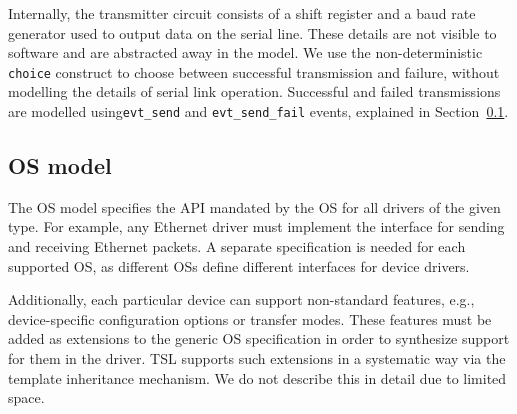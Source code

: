 \documentclass[a4paper,twoside,openright,11pt]{book}
\newcommand{\tsl}{TSL\xspace}
\theoremstyle{definition}
\newcommand{\src}[1]{\texttt{\small #1}}
\begin{document}
Internally, the transmitter circuit consists of a shift register and a baud rate generator used to output data on the serial line.  These details are not visible to software and are abstracted away in the model.  We use the non-deterministic \src{choice} construct to choose between successful transmission and failure, without modelling the details of serial link operation.  Successful and failed transmissions are modelled using\src{evt\_send} and \src{evt\_send\_fail} events, explained in Section~\ref{s:os}.

%

\subsection{OS model}\label{s:os}

The OS model specifies the API mandated by the OS for all drivers of the given type.  For example, any Ethernet driver must implement the interface for sending and receiving Ethernet packets.  A separate specification is needed for each supported OS, as different OSs define different interfaces for device drivers.


Additionally, each particular device can support non-standard features, e.g., device-specific configuration options or transfer modes.  These features must be added as extensions to the generic OS specification in order to synthesize support for them in the driver.  \tsl supports such extensions in a systematic way via the template inheritance mechanism.  We do not describe this in detail due to limited space.
\end{document}
